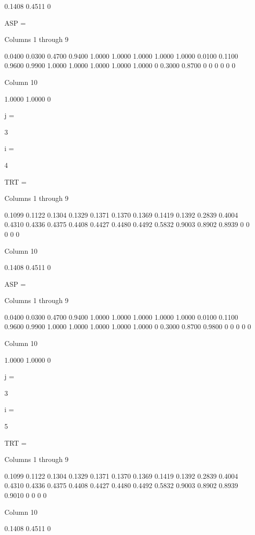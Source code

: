    0.1408
    0.4511
         0


ASP =

  Columns 1 through 9

    0.0400    0.0300    0.4700    0.9400    1.0000    1.0000    1.0000    1.0000    1.0000
    0.0100    0.1100    0.9600    0.9900    1.0000    1.0000    1.0000    1.0000    1.0000
         0    0.3000    0.8700         0         0         0         0         0         0

  Column 10

    1.0000
    1.0000
         0


j =

     3


i =

     4


TRT =

  Columns 1 through 9

    0.1099    0.1122    0.1304    0.1329    0.1371    0.1370    0.1369    0.1419    0.1392
    0.2839    0.4004    0.4310    0.4336    0.4375    0.4408    0.4427    0.4480    0.4492
    0.5832    0.9003    0.8902    0.8939         0         0         0         0         0

  Column 10

    0.1408
    0.4511
         0


ASP =

  Columns 1 through 9

    0.0400    0.0300    0.4700    0.9400    1.0000    1.0000    1.0000    1.0000    1.0000
    0.0100    0.1100    0.9600    0.9900    1.0000    1.0000    1.0000    1.0000    1.0000
         0    0.3000    0.8700    0.9800         0         0         0         0         0

  Column 10

    1.0000
    1.0000
         0


j =

     3


i =

     5


TRT =

  Columns 1 through 9

    0.1099    0.1122    0.1304    0.1329    0.1371    0.1370    0.1369    0.1419    0.1392
    0.2839    0.4004    0.4310    0.4336    0.4375    0.4408    0.4427    0.4480    0.4492
    0.5832    0.9003    0.8902    0.8939    0.9010         0         0         0         0

  Column 10

    0.1408
    0.4511
         0


